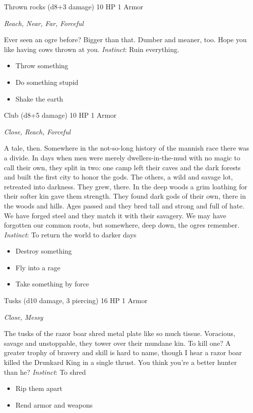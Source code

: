 Thrown rocks (d8+3 damage)\hspace*{\fill} 10 HP 1 Armor

\emph{Reach, Near, Far, Forceful}

\HRule
Ever seen an ogre before? Bigger than that. Dumber and meaner, too. Hope you like having cows thrown at you. \emph{Instinct}: Ruin everything.
\begin{itemize}
\item Throw something
\item Do something stupid
\item Shake the earth
\end{itemize}

\HRule
{}

Club (d8+5 damage)\hspace*{\fill} 10 HP 1 Armor

\emph{Close, Reach, Forceful}

\HRule
A tale, then. Somewhere in the not-so-long history of the mannish race there was a divide. In days when men were merely dwellers-in-the-mud with no magic to call their own, they split in two: one camp left their caves and the dark forests and built the first city to honor the gods. The others, a wild and savage lot, retreated into darkness. They grew, there. In the deep woods a grim loathing for their softer kin gave them strength. They found dark gods of their own, there in the woods and hills. Ages passed and they bred tall and strong and full of hate. We have forged steel and they match it with their savagery. We may have forgotten our common roots, but somewhere, deep down, the ogres remember. \emph{Instinct}: To return the world to darker days
\begin{itemize}
\item Destroy something
\item  Fly into a rage
\item  Take something by force
\end{itemize}
\newpage
\HRule
{}

Tusks (d10 damage, 3 piercing)\hspace*{\fill} 16 HP 1 Armor

\emph{Close, Messy}

\HRule
The tusks of the razor boar shred metal plate like so much tissue. Voracious, savage and unstoppable, they tower over their mundane kin. To kill one? A greater trophy of bravery and skill is hard to name, though I hear a razor boar killed the Drunkard King in a single thrust. You think you're a better hunter than he? \emph{Instinct}: To shred
\begin{itemize}
\item Rip them apart
\item Rend armor and weapons
\end{itemize}

